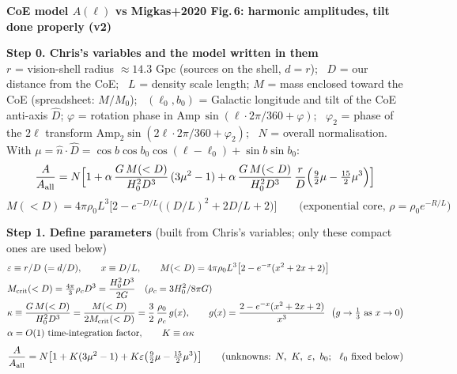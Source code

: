 \documentclass[11pt]{article}
\begin{document}
\textbf{\large CoE model $A(\ell)$ vs Migkas+2020 Fig.\,6: harmonic amplitudes, tilt done properly (v2)}

\medskip\textbf{Step 0. Chris's variables and the model written in them}\\[2pt]
$r$ = vision-shell radius $\approx14.3$ Gpc (sources on the shell, $d=r$); \ $D$ = our distance from the CoE; \ $L$ = density scale length;
$M$ = mass enclosed toward the CoE (spreadsheet: $M/M_0$); \ $(\ell_0,b_0)$ = Galactic longitude and tilt of the CoE anti-axis $\hat D$;
$\varphi$ = rotation phase in $\mathrm{Amp}\,\sin(\ell\cdot2\pi/360+\varphi)$; \ $\varphi_{2}$ = phase of the $2\ell$ transform $\mathrm{Amp}_2\sin(2\ell\cdot2\pi/360+\varphi_2)$; \ $N$ = overall normalisation.
With $\mu=\hat n\cdot\hat D=\cos b\cos b_0\cos(\ell-\ell_0)+\sin b\sin b_0$:
\[
\frac{A}{A_{\rm all}}=N\Big[1+\alpha\,\frac{G\,M(<D)}{H_0^2D^3}\,(3\mu^2-1)+\alpha\,\frac{G\,M(<D)}{H_0^2D^3}\,\frac{r}{D}\Big(\tfrac92\mu-\tfrac{15}{2}\mu^3\Big)\Big]
\]
\[
M(<D)=4\pi\rho_0L^3\big[2-e^{-D/L}\big((D/L)^2+2D/L+2\big)\big]\qquad\text{(exponential core, }\rho=\rho_0e^{-R/L})
\]

\medskip\textbf{Step 1. Define parameters} (built from Chris's variables; only these compact ones are used below)
\begin{align*}
&\varepsilon\equiv r/D\ (=d/D), \qquad x\equiv D/L, \qquad M(<D)=4\pi\rho_0L^3\big[2-e^{-x}(x^2+2x+2)\big]\\
&M_{\rm crit}(<D)=\tfrac{4\pi}{3}\rho_cD^3=\frac{H_0^2D^3}{2G}\quad(\rho_c=3H_0^2/8\pi G)\\
&\kappa\equiv\frac{G\,M(<D)}{H_0^2D^3}=\frac{M(<D)}{2M_{\rm crit}(<D)}=\frac32\,\frac{\rho_0}{\rho_c}\,g(x),\qquad g(x)=\frac{2-e^{-x}(x^2+2x+2)}{x^3}\ \ \big(g\to\tfrac13\text{ as }x\to0\big)\\
&\alpha=O(1)\ \text{time-integration factor},\qquad K\equiv\alpha\kappa
\end{align*}
\[
\frac{A}{A_{\rm all}}=N\big[1+K(3\mu^2-1)+K\varepsilon\big(\tfrac92\mu-\tfrac{15}{2}\mu^3\big)\big]\qquad\text{(unknowns: }N,\ K,\ \varepsilon,\ b_0;\ \ \ell_0\text{ fixed below)}
\]
\end{document}
